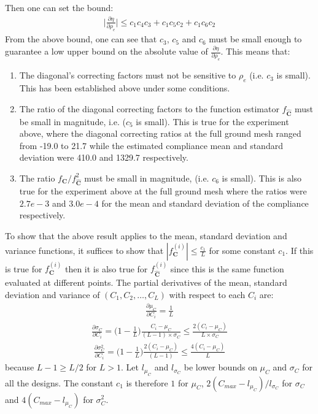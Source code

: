 Then one can set the bound:
\begin{align}
  \Biggl| \frac{\partial \eta}{\partial \rho_e} \Biggr| \leq c_1 c_4 c_3 + c_1 c_5 c_2 + c_1 c_6 c_2
\end{align}
From the above bound, one can see that $c_3$, $c_5$ and $c_6$ must be small enough to guarantee a low upper bound on the absolute value of $\frac{\partial \eta}{\partial \rho_e}$. This means that:
\begin{enumerate}
  \item The diagonal's correcting factors must not be sensitive to $\rho_e$ (i.e. $c_3$ is small). This has been established above under some conditions.
  \item The ratio of the diagonal correcting factors to the function estimator $f_{\hat{\bm{C}}}$ must be small in magnitude, i.e. ($c_5$ is small). This is true for the experiment above, where the diagonal correcting ratios at the full ground mesh ranged from -19.0 to 21.7 while the estimated compliance mean and standard deviation were 410.0 and 1329.7 respectively.
  \item The ratio $f_{\bm{C}} / f_{\hat{\bm{C}}}^2$ must be small in magnitude, (i.e. $c_6$ is small). This is also true for the experiment above at the full ground mesh where the ratios were $2.7e-3$ and $3.0e-4$ for the mean and standard deviation of the compliance respectively.
\end{enumerate}

To show that the above result applies to the mean, standard deviation and variance functions, it suffices to show that $|f_{\bm{C}}^{(i)}| \leq \frac{c_1}{L}$ for some constant $c_1$. If this is true for $f_{\bm{C}}^{(i)}$ then it is also true for $f_{\hat{\bm{C}}}^{(i)}$ since this is the same function evaluated at different points. The partial derivatives of the mean, standard deviation and variance of $(C_1, C_2, \dots, C_L)$ with respect to each $C_i$ are:
\begin{align}
    \frac{\partial \mu_C}{\partial C_i} = \frac{1}{L}
\end{align}
\begin{align}
    \frac{\partial \sigma_C}{\partial C_i} = \Big( 1 - \frac{1}{L} \Big) \frac{C_i - \mu_C}{(L - 1) \times \sigma_C} \leq \frac{2(C_i - \mu_C)}{L \times \sigma_C}
\end{align}
\begin{align}
    \frac{\partial \sigma_C^2}{\partial C_i} = \Big( 1 - \frac{1}{L} \Big) \frac{2(C_i - \mu_C)}{(L - 1)} \leq \frac{4(C_i - \mu_C)}{L}
\end{align}
because $L - 1 \geq L / 2$ for $L > 1$. Let $l_{\mu_C}$ and $l_{\sigma_C}$ be lower bounds on $\mu_C$ and $\sigma_C$ for all the designs. The constant $c_1$ is therefore $1$ for $\mu_C$, $2(C_{max} - l_{\mu_C})/l_{\sigma_C}$ for $\sigma_C$ and $4(C_{max} - l_{\mu_C})$ for $\sigma_C^2$.

